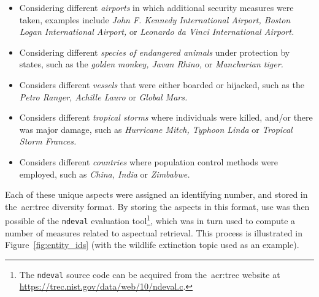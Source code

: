 \begin{itemize}
    \item{ Considering different \emph{airports} in which additional security measures were taken, examples include \emph{John F. Kennedy International Airport, Boston Logan International Airport,} or \emph{Leonardo da Vinci International Airport.}}
    \item{ Considering different \emph{species of endangered animals} under protection by states, such as the \emph{golden monkey, Javan Rhino,} or \emph{Manchurian tiger.}}
    \item{ Considers different \emph{vessels} that were either boarded or hijacked, such as the \emph{Petro Ranger, Achille Lauro} or \emph{Global Mars.}}
    \item{ Considers different \emph{tropical storms} where individuals were killed, and/or there was major damage, such as \emph{Hurricane Mitch, Typhoon Linda} or \emph{Tropical Storm Frances.}}
    \item{ Considers different \emph{countries} where population control methods were employed, such as \emph{China, India} or \emph{Zimbabwe.}}
\end{itemize}

Each of these unique aspects were assigned an identifying number, and stored in the~\gls{acr:trec} diversity format. By storing the aspects in this format, use was then possible of the \texttt{ndeval} evaluation tool\footnote{The \texttt{ndeval} source code can be acquired from the~\gls{acr:trec} website at \url{https://trec.nist.gov/data/web/10/ndeval.c}. }, which was in turn used to compute a number of measures related to aspectual retrieval. This process is illustrated in Figure~\ref{fig:entity_ids} (with the wildlife extinction topic used as an example).

